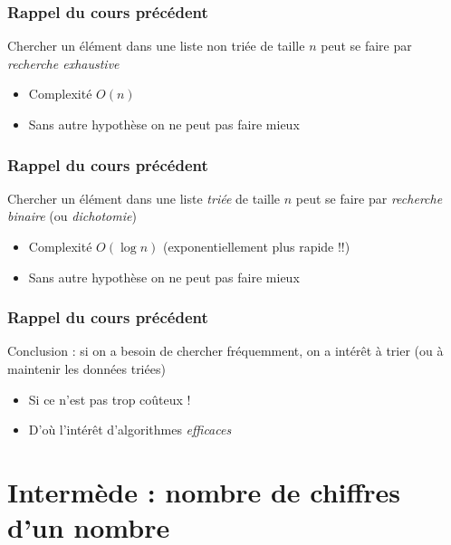 \documentclass[12pt]{linfo-beamer}
\begin{document}
\begin{frame}
 \frametitle{Rappel du cours précédent}

 Chercher un élément dans une liste non triée de taille $n$ peut se faire par
 \emph{recherche exhaustive}

 \begin{itemize}
    \item Complexité $O(n)$
    \item Sans autre hypothèse on ne peut pas faire mieux
 \end{itemize}

\end{frame}

\begin{frame}
 \frametitle{Rappel du cours précédent}

 Chercher un élément dans une liste \emph{triée} de taille $n$ peut se faire
 par \emph{recherche binaire} (ou \emph{dichotomie})

 \begin{itemize}
    \item Complexité $O(\log n)$ (exponentiellement plus rapide !!)
    \item Sans autre hypothèse on ne peut pas faire mieux
 \end{itemize}

\end{frame}

\begin{frame}
 \frametitle{Rappel du cours précédent}

 Conclusion : si on a besoin de chercher fréquemment, on a intérêt à trier (ou à maintenir les données triées)

\begin{itemize}
    \item Si ce n'est pas trop coûteux !
    \item D'où l'intérêt d'algorithmes \emph{efficaces}
 \end{itemize}

\end{frame}


\section{Intermède : nombre de chiffres d'un nombre}
\end{document}
